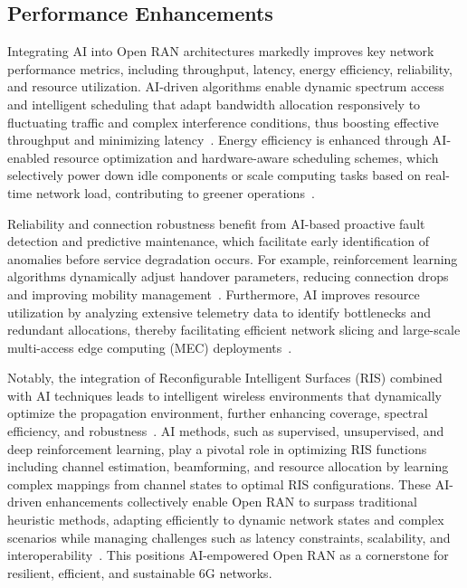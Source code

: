 \documentclass[sigconf]{acmart}
\begin{document}
\subsection{Performance Enhancements}

Integrating AI into Open RAN architectures markedly improves key network performance metrics, including throughput, latency, energy efficiency, reliability, and resource utilization. AI-driven algorithms enable dynamic spectrum access and intelligent scheduling that adapt bandwidth allocation responsively to fluctuating traffic and complex interference conditions, thus boosting effective throughput and minimizing latency~\cite{ref54}. Energy efficiency is enhanced through AI-enabled resource optimization and hardware-aware scheduling schemes, which selectively power down idle components or scale computing tasks based on real-time network load, contributing to greener operations~\cite{ref49}.

Reliability and connection robustness benefit from AI-based proactive fault detection and predictive maintenance, which facilitate early identification of anomalies before service degradation occurs. For example, reinforcement learning algorithms dynamically adjust handover parameters, reducing connection drops and improving mobility management~\cite{ref54}. Furthermore, AI improves resource utilization by analyzing extensive telemetry data to identify bottlenecks and redundant allocations, thereby facilitating efficient network slicing and large-scale multi-access edge computing (MEC) deployments~\cite{ref49}.

Notably, the integration of Reconfigurable Intelligent Surfaces (RIS) combined with AI techniques leads to intelligent wireless environments that dynamically optimize the propagation environment, further enhancing coverage, spectral efficiency, and robustness~\cite{ref49}. AI methods, such as supervised, unsupervised, and deep reinforcement learning, play a pivotal role in optimizing RIS functions including channel estimation, beamforming, and resource allocation by learning complex mappings from channel states to optimal RIS configurations. These AI-driven enhancements collectively enable Open RAN to surpass traditional heuristic methods, adapting efficiently to dynamic network states and complex scenarios while managing challenges such as latency constraints, scalability, and interoperability~\cite{ref54}. This positions AI-empowered Open RAN as a cornerstone for resilient, efficient, and sustainable 6G networks.
\end{document}
